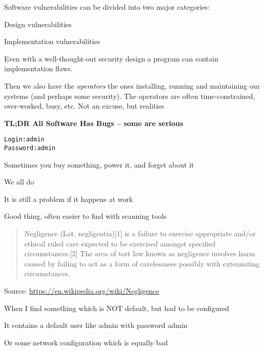 \documentclass[Screen16to9,17pt]{foils}
\begin{document}

Software vulnerabilities can be divided into two major categories:
\begin{list2}
\item Design vulnerabilities
\item Implementation vulnerabilities
\end{list2}

Even with a well-thought-out security design a program can contain implementation flaws.

Then we also have the \emph{operators} the ones installing, running and maintaining our systems (and perhaps some security). The operators are often time-constrained, over-worked, busy, etc. Not an excuse, but realities

{\bf\Large TL;DR All Software Has Bugs -- some are serious}



\begin{alltt}
Login: admin
Password: admin
\end{alltt}

\begin{list2}
\item Sometimes you buy something, power it, and forget about it
\item We all do
\item It is still a problem if it happens at work
\item Good thing, often easier to find with scanning tools
\end{list2}




\begin{quote}
Negligence (Lat. negligentia)[1] is a failure to exercise appropriate and/or ethical ruled care expected to be exercised amongst specified circumstances.[2] The area of tort law known as negligence involves harm caused by failing to act as a form of carelessness possibly with extenuating circumstances.
\end{quote}
Source: \url{https://en.wikipedia.org/wiki/Negligence}


\begin{list2}
\item When I find something which is NOT default, but had to be configured
\item It contains a default user like admin with password admin
\item Or some network configuration which is equally bad
\end{list2}
\end{document}
